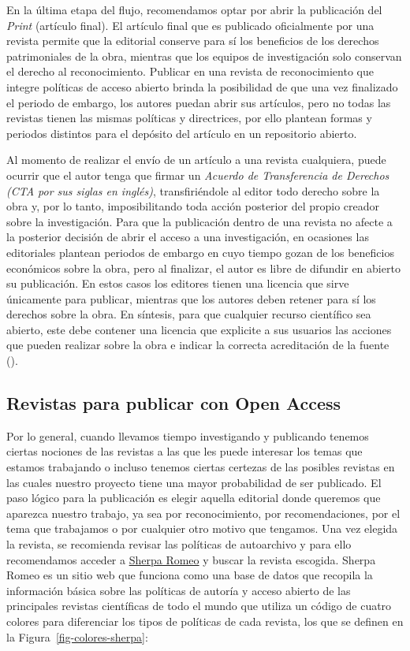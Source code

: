 \documentclass[
  spanish,
  a4paper,
  oneside]{scrbook}
\begin{document}
En la última etapa del flujo, recomendamos optar por abrir la
publicación del \emph{Print} (artículo final). El artículo final que es
publicado oficialmente por una revista permite que la editorial conserve
para sí los beneficios de los derechos patrimoniales de la obra,
mientras que los equipos de investigación solo conservan el derecho al
reconocimiento. Publicar en una revista de reconocimiento que integre
políticas de acceso abierto brinda la posibilidad de que una vez
finalizado el periodo de embargo, los autores puedan abrir sus
artículos, pero no todas las revistas tienen las mismas políticas y
directrices, por ello plantean formas y periodos distintos para el
depósito del artículo en un repositorio abierto.

Al momento de realizar el envío de un artículo a una revista cualquiera,
puede ocurrir que el autor tenga que firmar un \emph{Acuerdo de
Transferencia de Derechos (CTA por sus siglas en inglés)},
transfiriéndole al editor todo derecho sobre la obra y, por lo tanto,
imposibilitando toda acción posterior del propio creador sobre la
investigación. Para que la publicación dentro de una revista no afecte a
la posterior decisión de abrir el acceso a una investigación, en
ocasiones las editoriales plantean periodos de embargo en cuyo tiempo
gozan de los beneficios económicos sobre la obra, pero al finalizar, el
autor es libre de difundir en abierto su publicación. En estos casos los
editores tienen una licencia que sirve únicamente para publicar,
mientras que los autores deben retener para sí los derechos sobre la
obra. En síntesis, para que cualquier recurso científico sea abierto,
este debe contener una licencia que explicite a sus usuarios las
acciones que pueden realizar sobre la obra e indicar la correcta
acreditación de la fuente ().

\subsection{Revistas para publicar con Open
Access}\label{revistas-para-publicar-con-open-access}

Por lo general, cuando llevamos tiempo investigando y publicando tenemos
ciertas nociones de las revistas a las que les puede interesar los temas
que estamos trabajando o incluso tenemos ciertas certezas de las
posibles revistas en las cuales nuestro proyecto tiene una mayor
probabilidad de ser publicado. El paso lógico para la publicación es
elegir aquella editorial donde queremos que aparezca nuestro trabajo, ya
sea por reconocimiento, por recomendaciones, por el tema que trabajamos
o por cualquier otro motivo que tengamos. Una vez elegida la revista, se
recomienda revisar las políticas de autoarchivo y para ello recomendamos
acceder a \href{https://v2.sherpa.ac.uk/romeo/}{Sherpa Romeo} y buscar
la revista escogida. Sherpa Romeo es un sitio web que funciona como una
base de datos que recopila la información básica sobre las políticas de
autoría y acceso abierto de las principales revistas científicas de todo
el mundo que utiliza un código de cuatro colores para diferenciar los
tipos de políticas de cada revista, los que se definen en la
Figura~\ref{fig-colores-sherpa}:
\end{document}
